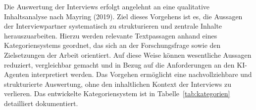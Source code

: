 Die Auswertung der Interviews erfolgt angelehnt an eine qualitative Inhaltsanalyse nach Mayring (2019). Ziel dieses Vorgehens ist es, die Aussagen der Interviewpartner systematisch zu strukturieren und zentrale Inhalte herauszuarbeiten. Hierzu werden relevante Textpassagen anhand eines Kategoriensystems geordnet, das sich an der Forschungsfrage sowie den Zielsetzungen der Arbeit orientiert. Auf diese Weise können wesentliche Aussagen reduziert, vergleichbar gemacht und in Bezug auf die Anforderungen an den \ac{KI}-Agenten interpretiert werden. Das Vorgehen ermöglicht eine nachvollziehbare und strukturierte Auswertung, ohne den inhaltlichen Kontext der Interviews zu verlieren. \cite[\pagef 633ff]{mayring_qualitative_2019} Das entwickelte Kategoriensystem ist in Tabelle~\ref{tab:kategorien} detailliert dokumentiert.
